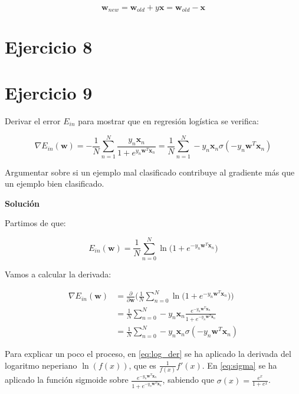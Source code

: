 \documentclass[11pt,a4paper]{article}
\newcommand{\answer}{\noindent\textbf{Solución}}
\begin{document}
\begin{equation}
	\mathbf{w}_{new} = \mathbf{w}_{old} + y\mathbf{x} = \mathbf{w}_{old} - \mathbf{x}
\end{equation}

\section*{Ejercicio 8}

\section*{Ejercicio 9}

\noindent Derivar el error $E_{in}$ para mostrar que en regresión logística se verifica:

\[\nabla E_{in}(\mathbf{w}) = -\frac{1}{N} \displaystyle \sum_{n=1}^N \frac{y_n\mathbf{x}_n}{1 +
e^{y_n\mathbf{w}^T\mathbf{x}_n}} =
\frac{1}{N} \displaystyle \sum_{n=1}^N -y_n \mathbf{x}_n \sigma (-y_n\mathbf{w}^T\mathbf{x}_n)
\]

\noindent Argumentar sobre si un ejemplo mal clasificado contribuye al gradiente más que un ejemplo bien clasificado.

\answer

Partimos de que:

\begin{equation}
	E_{in}(\textbf{w}) = \frac{1}{N} \displaystyle \sum_{n=0}^N \ln\Big(1 + e^{-y_n\mathbf{w}^T\mathbf{x}_n}\Big)
\end{equation}

Vamos a calcular la derivada:


\begin{align}
	\nabla E_{in}(\mathbf{w}) &= \frac{\partial}{\partial \mathbf{w}} \bigg( \frac{1}{N}	\displaystyle \sum_{n=0}^N 
	\ln\Big(1 + e^{-y_n\mathbf{w}^T\mathbf{x}_n}\Big) \bigg) \\
	&= \frac{1}{N} \displaystyle \sum_{n=0}^N
	-y_n\mathbf{x}_n \frac{e^{-y_n\mathbf{w}^T\mathbf{x}_n}}{1 + e^{-y_n\mathbf{w}^T\mathbf{x}_n}} \label{eq:log_der}\\ 
	&= \frac{1}{N} \displaystyle \sum_{n=0}^N 
	-y_n\mathbf{x}_n \sigma (-y_n\mathbf{w}^T\mathbf{x}_n) \label{eq:sigma}
\end{align}

Para explicar un poco el proceso, en \eqref{eq:log_der} se ha aplicado la derivada del logaritmo neperiano $\ln(f(x))$,
que es $\frac{1}{f(x)}f'(x)$. En \eqref{eq:sigma} se ha aplicado la función sigmoide sobre
$\frac{e^{-y_n\mathbf{w}^T\mathbf{x}_n}}{1 + e^{-y_n\mathbf{w}^T\mathbf{x}_n}}$, sabiendo que
$\sigma(x) = \frac{e^x}{1 + e^x}$.
\end{document}
